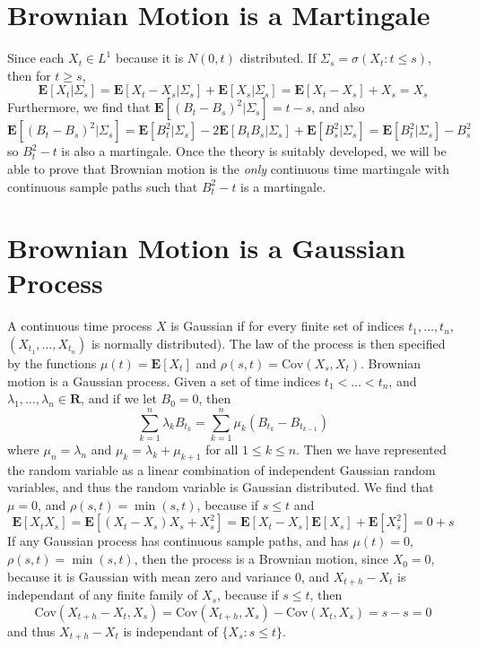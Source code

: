 \section{Brownian Motion is a Martingale}

Since each $X_t \in L^1$ because it is $N(0,t)$ distributed. If $\Sigma_s = \sigma(X_t: t \leq s)$, then for $t \geq s$,
    \[ \mathbf{E}[X_t | \Sigma_s] = \mathbf{E}[X_t - X_s | \Sigma_s] + \mathbf{E}[X_s|\Sigma_s] = \mathbf{E}[X_t - X_s] + X_s = X_s \]
    Furthermore, we find that $\mathbf{E}[(B_t - B_s)^2|\Sigma_s] = t-s$, and also
    \[ \mathbf{E}[(B_t - B_s)^2 | \Sigma_s] = \mathbf{E}[B_t^2|\Sigma_s] - 2\mathbf{E}[B_tB_s|\Sigma_s] + \mathbf{E}[B_s^2|\Sigma_s] = \mathbf{E}[B_t^2|\Sigma_s] - B_s^2 \]
    so $B_t^2 - t$ is also a martingale. Once the theory is suitably developed, we will be able to prove that Brownian motion is the {\it only} continuous time martingale with continuous sample paths such that $B_t^2 - t$ is a martingale.

\section{Brownian Motion is a Gaussian Process}

A continuous time process $X$ is Gaussian if for every finite set of indices $t_1, \dots, t_n$, $(X_{t_1}, \dots, X_{t_n})$ is normally distributed). The law of the process is then specified by the functions $\mu(t) = \mathbf{E}[X_t]$ and $\rho(s,t) = \text{Cov}(X_s, X_t)$. Brownian motion is a Gaussian process. Given a set of time indices $t_1 < \dots < t_n$, and $\lambda_1, \dots, \lambda_n \in \mathbf{R}$, and if we let $B_0 = 0$, then
    \[ \sum_{k = 1}^n \lambda_k B_{t_k} = \sum_{k = 1}^n \mu_k (B_{t_k} - B_{t_{k-1}}) \]
    where $\mu_n = \lambda_n$ and $\mu_k = \lambda_k + \mu_{k+1}$ for all $1 \leq k \leq n$. Then we have represented the random variable as a linear combination of independent Gaussian random variables, and thus the random variable is Gaussian distributed. We find that $\mu = 0$, and $\rho(s,t) = \min(s,t)$, because if $s \leq t$ and
    \[ \mathbf{E}[X_tX_s] = \mathbf{E}[(X_t - X_s)X_s + X_s^2] = \mathbf{E}[X_t - X_s] \mathbf{E}[X_s] + \mathbf{E}[X_s^2] = 0 + s \]
    If any Gaussian process has continuous sample paths, and has $\mu(t) = 0$, $\rho(s,t) = \min(s,t)$, then the process is a Brownian motion, since $X_0 = 0$, because it is Gaussian with mean zero and variance 0, and $X_{t+h} - X_t$ is independant of any finite family of $X_s$, because if $s \leq t$, then
    \[ \text{Cov}(X_{t+h} - X_t, X_s) = \text{Cov}(X_{t+h}, X_s) - \text{Cov}(X_t, X_s) = s - s = 0 \]
    and thus $X_{t+h} - X_t$ is independant of $\{ X_s : s \leq t \}$.


